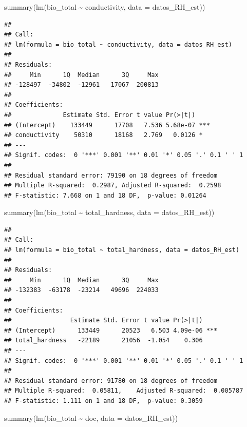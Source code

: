 \documentclass[
]{book}
\newenvironment{Shaded}{\begin{snugshade}}{\end{snugshade}}
\newcommand{\AttributeTok}[1]{\textcolor[rgb]{0.77,0.63,0.00}{#1}}
\newcommand{\FunctionTok}[1]{\textcolor[rgb]{0.00,0.00,0.00}{#1}}
\newcommand{\NormalTok}[1]{#1}
\newcommand{\SpecialCharTok}[1]{\textcolor[rgb]{0.00,0.00,0.00}{#1}}
\begin{document}
\begin{Shaded}
\begin{Highlighting}[]
\FunctionTok{summary}\NormalTok{(}\FunctionTok{lm}\NormalTok{(bio\_total }\SpecialCharTok{\textasciitilde{}}\NormalTok{ conductivity, }\AttributeTok{data =}\NormalTok{ datos\_RH\_est))}
\end{Highlighting}
\end{Shaded}

\begin{verbatim}
## 
## Call:
## lm(formula = bio_total ~ conductivity, data = datos_RH_est)
## 
## Residuals:
##     Min      1Q  Median      3Q     Max 
## -128497  -34802  -12961   17067  200813 
## 
## Coefficients:
##              Estimate Std. Error t value Pr(>|t|)    
## (Intercept)    133449      17708   7.536 5.68e-07 ***
## conductivity    50310      18168   2.769   0.0126 *  
## ---
## Signif. codes:  0 '***' 0.001 '**' 0.01 '*' 0.05 '.' 0.1 ' ' 1
## 
## Residual standard error: 79190 on 18 degrees of freedom
## Multiple R-squared:  0.2987, Adjusted R-squared:  0.2598 
## F-statistic: 7.668 on 1 and 18 DF,  p-value: 0.01264
\end{verbatim}

\begin{Shaded}
\begin{Highlighting}[]
\FunctionTok{summary}\NormalTok{(}\FunctionTok{lm}\NormalTok{(bio\_total }\SpecialCharTok{\textasciitilde{}}\NormalTok{ total\_hardness, }\AttributeTok{data =}\NormalTok{ datos\_RH\_est))}
\end{Highlighting}
\end{Shaded}

\begin{verbatim}
## 
## Call:
## lm(formula = bio_total ~ total_hardness, data = datos_RH_est)
## 
## Residuals:
##     Min      1Q  Median      3Q     Max 
## -132383  -63178  -23214   49696  224033 
## 
## Coefficients:
##                Estimate Std. Error t value Pr(>|t|)    
## (Intercept)      133449      20523   6.503 4.09e-06 ***
## total_hardness   -22189      21056  -1.054    0.306    
## ---
## Signif. codes:  0 '***' 0.001 '**' 0.01 '*' 0.05 '.' 0.1 ' ' 1
## 
## Residual standard error: 91780 on 18 degrees of freedom
## Multiple R-squared:  0.05811,    Adjusted R-squared:  0.005787 
## F-statistic: 1.111 on 1 and 18 DF,  p-value: 0.3059
\end{verbatim}

\begin{Shaded}
\begin{Highlighting}[]
\FunctionTok{summary}\NormalTok{(}\FunctionTok{lm}\NormalTok{(bio\_total }\SpecialCharTok{\textasciitilde{}}\NormalTok{ doc, }\AttributeTok{data =}\NormalTok{ datos\_RH\_est))}
\end{Highlighting}
\end{Shaded}
\end{document}
